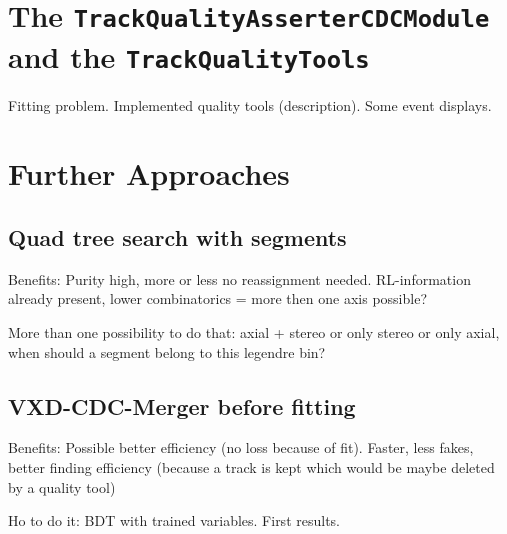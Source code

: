 \section{The \texttt{TrackQualityAsserterCDCModule} and the \texttt{TrackQualityTools}}

Fitting problem. Implemented quality tools (description). Some event displays.

\section{Further Approaches}
\subsection{Quad tree search with segments}
Benefits: Purity high, more or less no reassignment needed. RL-information already present, lower combinatorics = more then one axis possible?

More than one possibility to do that: axial + stereo or only stereo or only axial, when should a segment belong to this legendre bin?

\subsection{VXD-CDC-Merger before fitting}
Benefits: Possible better efficiency (no loss because of fit). Faster, less fakes, better finding efficiency (because a track is kept which would be maybe deleted by a quality tool)

Ho to do it: BDT with trained variables. First results.
